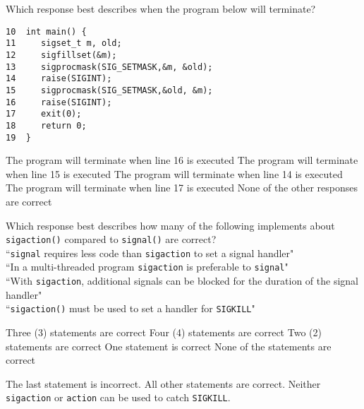 

\variant
Which response best describes when the program below will terminate?
\begin{verbatim}
10  int main() {
11     sigset_t m, old;
12     sigfillset(&m);
13     sigprocmask(SIG_SETMASK,&m, &old);
14     raise(SIGINT);
15     sigprocmask(SIG_SETMASK,&old, &m);
16     raise(SIGINT);
17     exit(0);
18     return 0;
19  }
\end{verbatim}
\begin{answers}
\answer The program will terminate when line 16 is executed
\correctanswer The program will terminate when line 15 is executed
\answer The program will terminate when line 14 is executed
\answer The program will terminate when line 17 is executed
\answer None of the other responses are correct
\end{answers}
\begin{solution}
\end{solution}


\variant
Which response best describes how many of the following implements about {\tt sigaction()} compared to {\tt signal()} are correct? \\
``{\tt  signal} requires less code than {\tt sigaction} to set a signal handler" \\
``In a multi-threaded program {\tt sigaction} is preferable to {\tt signal}" \\
``With {\tt sigaction}, additional signals can be blocked for the duration of the signal handler" \\
``{\tt sigaction()} must be used to set a handler for {\tt SIGKILL}" \\
\begin{answers}
\correctanswer  Three (3) statements are correct
\answer  Four (4) statements are correct
\answer Two (2) statements are correct
\answer One statement is correct
\answer None of the statements are correct
\end{answers}
\begin{solution}
The last statement is incorrect. All other statements are correct. Neither {\tt sigaction} or {\tt action} can be used to catch {\tt SIGKILL}.
\end{solution}

